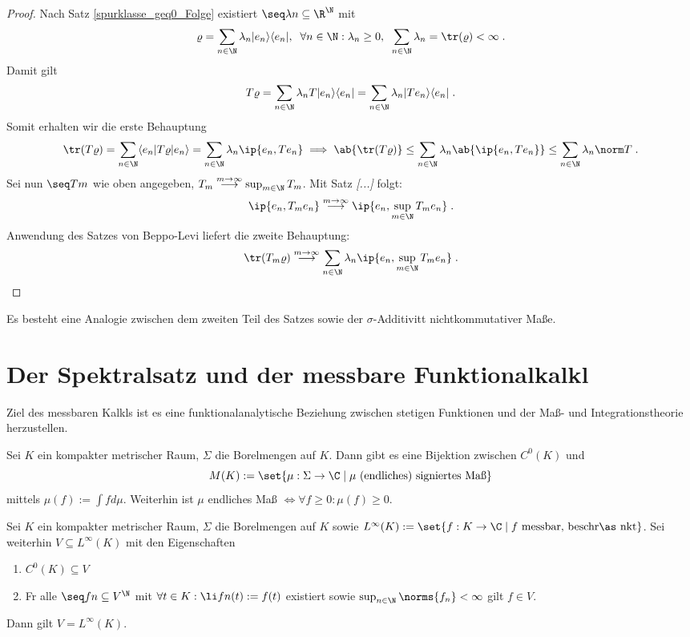 \begin{proof}
	Nach Satz \ref{spurklasse_geq0_Folge} existiert \(\seq \lambda n \subseteq \R^\N\) mit 
	\[\varrho = \sum_{n\in\N} \lambda_n | e_n \rangle \langle e_n |, \;\; \forall n\in\N: \lambda_n \geq 0, \;\;\sum_{n\in\N} \lambda_n = \tr(\varrho) < \infty\;.\]
	Damit gilt
	\[T\varrho = \sum_{n\in\N} \lambda_n T | e_n \rangle \langle e_n | = \sum_{n\in\N} \lambda_n | Te_n \rangle \langle e_n | \;.\]
	Somit erhalten wir die erste Behauptung
	\[\tr(T\varrho) = \sum_{n\in\N} \langle e_n | T\varrho | e_n \rangle = \sum_{n\in\N} \lambda_n \ip{e_n, Te_n} \implies \ab{\tr(T\varrho)} \leq \sum_{n\in\N} \lambda_n \ab{\ip{e_n, Te_n}} \leq \sum_{n\in\N} \lambda_n\norm T\;.\]
	Sei nun \(\seq Tm\) wie oben angegeben, \(T_m \overset{m\to\infty}{\longrightarrow} \sup_{m\in\N}T_m\). Mit Satz \textit{[...]} folgt:
	\[\ip{e_n, T_m e_n} \overset{m\to\infty}{\longrightarrow} \ip{e_n, \sup_{m\in\N} T_m e_n}\;.\]
	Anwendung des Satzes von Beppo-Levi liefert die zweite Behauptung:
	\[\tr(T_m\varrho)\overset{m\to\infty}{\longrightarrow}  \sum_{n\in\N} \lambda_n\ip{e_n, \sup_{m\in\N} T_m e_n}\;.\]
\end{proof}
\begin{rem}
	Es besteht eine Analogie zwischen dem zweiten Teil des Satzes sowie der $\sigma$-Additivit\as t nichtkommutativer Ma\ss{}e. 
\end{rem}

\section{Der Spektralsatz und der messbare Funktionalkalk\us l}
\begin{rem}
	Ziel des messbaren Kalk\us ls ist es eine funktionalanalytische Beziehung zwischen stetigen Funktionen und der Ma\ss{}- und Integrationstheorie herzustellen.
\end{rem}

\begin{theorem}
	Sei $K$ ein kompakter metrischer Raum, $\Sigma$ die Borelmengen auf $K$. Dann gibt es eine Bijektion zwischen $C^0(K)$ und 
	\[M(K) := \set{\mu:\Sigma \to \C\;\vert\; \mu \text{ (endliches) signiertes Ma\ss{}}}\]
	mittels \(\mu(f):= \int f d\mu\). Weiterhin ist $\mu$ endliches Ma\ss{} \(\iff \forall f \geq 0 : \mu(f) \geq 0\).
\end{theorem}

\begin{theorem}
	Sei $K$ ein kompakter metrischer Raum, $\Sigma$ die Borelmengen auf $K$ sowie \(L^\infty(K):= \set{f: K\to\C\;\vert\; f \text{ messbar, beschr\as nkt}}\). Sei weiterhin \(V\subseteq L^\infty(K)\) mit den Eigenschaften \label{lemma_mess_kalk}
	\begin{enumerate}
		\item \(C^0(K)\subseteq V\)
		\item F\us r alle \(\seq fn \subseteq V^\N\) mit \(\forall t \in K: \li fn(t) := f(t)\) existiert sowie  \(\sup_{n\in\N}\norms{f_n} < \infty\) gilt \(f\in V\). \label{lemma_mess_kalk_2}
	\end{enumerate}
	Dann gilt \(V = L^\infty(K)\).
\end{theorem}

